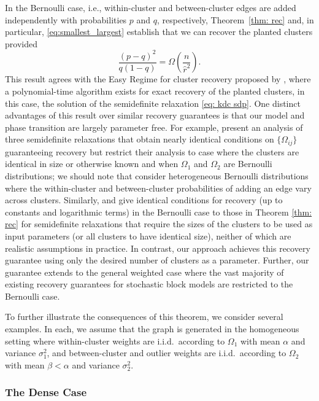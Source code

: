 \documentclass[twoside,11pt]{article}
\newcommand{\0}{\bs{0}}
\newcommand{\rbra}[1]{\ensuremath{\left( #1 \right)}} %
\begin{document}
{In the %
Bernoulli case, i.e., within-cluster and between-cluster edges are added independently with probabilities $p$ and $q$, respectively, Theorem~\ref{thm: rec} and, in particular,
\eqref{eq:smallest_largest} establish that we can recover the planted
clusters provided
\[
	\frac{(p-q)^2}{q(1-q)} = \Omega\rbra{ \frac{ n }{\hat r^2}}.
\]
This result agrees with the Easy Regime for cluster recovery
proposed by \cite{chen2014statistical}, where a polynomial-time
algorithm exists for exact recovery of the planted clusters, in this case, the solution of the semidefinite relaxation \eqref{eq: kdc sdp}.
One distinct advantages of this result over similar recovery guarantees
is that our model and phase transition are largely parameter free.
For example, \citet{amini2014semidefinite} present an analysis of three
semidefinite relaxations that obtain nearly identical conditions
on $\{\Omega_{ij}\}$ guaranteeing recovery but restrict their
analysis to case where the clusters are identical in size
or otherwise known and when $\Omega_1$
and $\Omega_2$ are Bernoulli distributions; we should note that
\citet{amini2014semidefinite} consider heterogeneous Bernoulli
distributions where the within-cluster and between-cluster probabilities
of adding an edge vary across clusters.
Similarly, \citet{chen2014statistical} and \citet{jalali2015relative} give identical
conditions for recovery
(up to constants and logarithmic terms)
in the Bernoulli case
to those in Theorem \eqref{thm: rec} for
semidefinite relaxations that require the sizes of the clusters to
be used as input parameters (or all clusters to have identical size), neither
of which are realistic assumptions in practice.
In contrast, our approach achieves this recovery guarantee
using only the desired number of clusters as a parameter.
Further, our guarantee extends to the general weighted case where
the vast majority of existing recovery guarantees for stochastic
block models are restricted to the Bernoulli case.

To further illustrate the consequences of this theorem, we consider
several examples. In each, we assume that the graph is
generated in the homogeneous setting where
within-cluster weights are i.i.d.~according to $\Omega_1$ with mean $\alpha$ and variance $
\sigma_1^2$, and
between-cluster and outlier weights are i.i.d.~according to
$\Omega_2$ with mean $\beta < \alpha$ and variance $\sigma_2^2$.


\subsubsection{The Dense Case}

}
\end{document}
